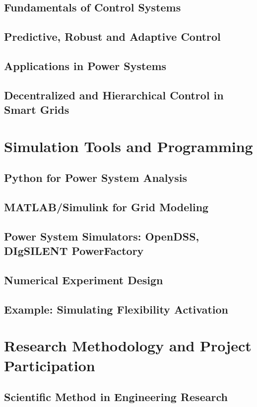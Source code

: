 \documentclass[11pt]{article}
\begin{document}
	\subsection{Fundamentals of Control Systems}
	\subsection{Predictive, Robust and Adaptive Control}
	\subsection{Applications in Power Systems}
	\subsection{Decentralized and Hierarchical Control in Smart Grids}
	
	\section{Simulation Tools and Programming}
	\subsection{Python for Power System Analysis}
	\subsection{MATLAB/Simulink for Grid Modeling}
	\subsection{Power System Simulators: OpenDSS, DIgSILENT PowerFactory}
	\subsection{Numerical Experiment Design}
	\subsection{Example: Simulating Flexibility Activation}
	
	\section{Research Methodology and Project Participation}
	\subsection{Scientific Method in Engineering Research}
\end{document}
